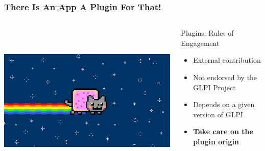 \documentclass{beamer}
\begin{document}
\begin{frame}

    \frametitle{\textbf{There Is \sout{An App} A Plugin For That!}}

 \begin{columns}
 \begin{column}{0.45\textwidth}
         \includegraphics[height=7.5cm]{./pics/nyancat.jpg}
 \end{column}
 \begin{column}{0.65\textwidth}
    \begin{block}{Plugins: Rules of Engagement}
        \begin{itemize}
            \item External contribution
            \item Not endorsed by the GLPI Project
            \item Depends on a given version of GLPI
            \pause
            \item \textbf{Take care on the plugin origin} 
        \end{itemize}
    \end{block}

 \end{column}
\end{columns}

\end{frame}
\end{document}
